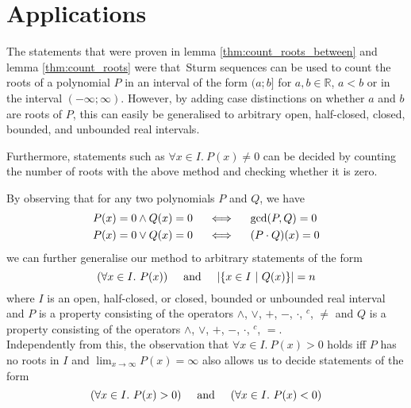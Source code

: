 \documentclass[11pt,a4paper,oneside]{article}
\newcommand{\RR}{\mathbb{R}}
\begin{document}
\newpage
\section{Applications}
\label{sec:applications}

The statements that were proven in lemma \ref{thm:count_roots_between} and lemma \ref{thm:count_roots} were that\ Sturm se\-quen\-ces can be used to count the roots of a polynomial $P$ in an interval of the form $(a;b]$ for $a,b\in\RR$, $a < b$ or in the interval $(-\infty;\infty)$. However, by adding case distinctions on whether $a$ and $b$ are roots of $P$, this can easily be generalised to arbitrary open, half-closed, closed, bounded, and unbounded real intervals.

Furthermore, statements such as $\forall x \in I.\ P(x) \neq 0$ can be decided by counting the number of roots with the above method and checking whether it is zero.

By observing that for any two polynomials $P$ and $Q$, we have 
\begin{align*}
P(x) = 0 \wedge Q(x) = 0\hskip5mm&\Longleftrightarrow\hskip5mm \gcd(P,Q) = 0\\
P(x) = 0 \vee Q(x) = 0\hskip5mm&\Longleftrightarrow\hskip5mm (P\cdot Q)(x) = 0
\end{align*}
we can further generalise our method to arbitrary statements of the form
$$(\forall x \in I.\ P(x))\hskip5mm\mathrm{and}\hskip5mm |\{x\in I\ |\ Q(x)\}| = n$$
where $I$ is an open, half-closed, or closed, bounded or unbounded real interval and $P$ is a property consisting of the operators $\wedge$, $\vee$, $+$, $-$, $\cdot$, $^c$, $\neq$ and $Q$ is a property consisting of the operators $\wedge$, $\vee$, $+$, $-$, $\cdot$, $^c$, $=$.\\

Independently from this, the observation that $\forall x\in I.\ P(x)>0$ holds iff $P$ has no roots in $I$ and $\lim_{x\to\infty} P(x) = \infty$ also allows us to decide statements of the form
$$(\forall x\in I.\ P(x) > 0)\hskip5mm\mathrm{and}\hskip5mm(\forall x\in I.\ P(x) < 0)$$\vskip5mm
\end{document}
